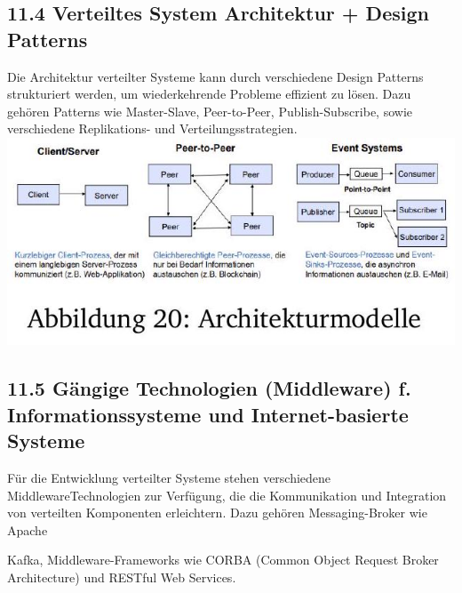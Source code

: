 \documentclass[10pt]{article}
\begin{document}
\subsection*{11.4 Verteiltes System Architektur + Design Patterns}
Die Architektur verteilter Systeme kann durch verschiedene Design Patterns strukturiert werden, um wiederkehrende Probleme effizient zu lösen. Dazu gehören Patterns wie Master-Slave, Peer-to-Peer, Publish-Subscribe, sowie verschiedene Replikations- und Verteilungsstrategien.\\
\includegraphics[width=\linewidth]{images/2024_12_29_0d1d7b5551ea1b4b41bdg-18}

\subsection*{11.5 Gängige Technologien (Middleware) f. Informationssysteme und Internet-basierte Systeme}
Für die Entwicklung verteilter Systeme stehen verschiedene MiddlewareTechnologien zur Verfügung, die die Kommunikation und Integration von verteilten Komponenten erleichtern. Dazu gehören Messaging-Broker wie Apache

Kafka, Middleware-Frameworks wie CORBA (Common Object Request Broker Architecture) und RESTful Web Services.
\end{document}
